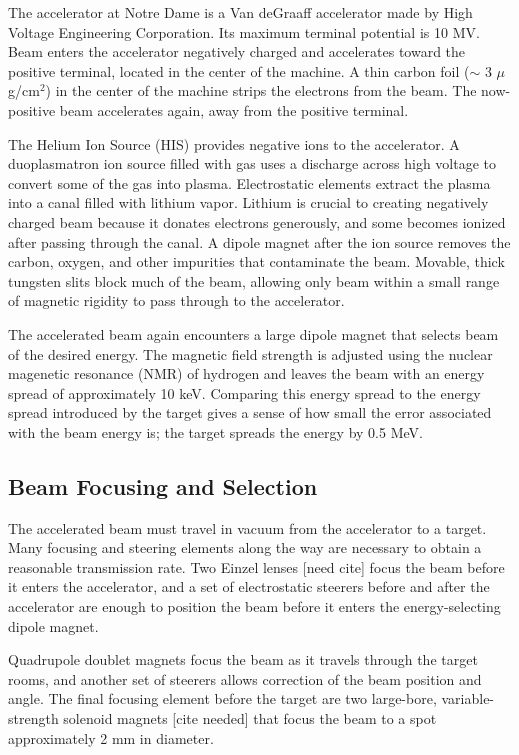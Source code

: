 The accelerator at Notre Dame is a Van deGraaff accelerator made by High Voltage Engineering Corporation.  Its maximum terminal potential is 10 MV.  Beam enters the accelerator negatively charged and accelerates toward the positive terminal, located in the center of the machine. A thin carbon foil ($\sim$ 3 $\mu$g/cm$^2$) in the center of the machine strips the electrons from the beam.  The now-positive beam accelerates again, away from the positive terminal.  

The Helium Ion Source (HIS) provides negative  ions to the accelerator.  A duoplasmatron ion source filled with  gas uses a discharge across high voltage to convert some of the gas into plasma.  Electrostatic elements extract the plasma into a canal filled with lithium vapor.  Lithium is crucial to creating negatively charged beam because it donates electrons generously, and some  becomes ionized after passing through the canal.  A dipole magnet after the ion source removes the carbon, oxygen, and other impurities that contaminate the  beam.  Movable, thick tungsten slits block much of the beam, allowing only beam within a small range of magnetic rigidity to pass through to the accelerator.

The accelerated beam again encounters a large dipole magnet that selects beam of the desired energy.  The magnetic field strength is adjusted using the nuclear magenetic resonance (NMR) of hydrogen and leaves the beam with an energy spread of approximately 10 keV.  Comparing this energy spread to the energy spread introduced by the target gives a sense of how small the error associated with the beam energy is; the target spreads the energy by 0.5 MeV.

\subsection{Beam Focusing and Selection}

The accelerated beam must travel in vacuum from the accelerator to a target.  Many focusing and steering elements along the way are necessary to obtain a reasonable transmission rate.  Two Einzel lenses [need cite] focus the beam before it enters the accelerator, and a set of electrostatic steerers before and after the accelerator are enough to position the beam before it enters the energy-selecting dipole magnet.

Quadrupole doublet magnets focus the beam as it travels through the target rooms, and another set of steerers allows correction of the beam position and angle.  The final focusing element before the target are two large-bore, variable-strength solenoid magnets [cite needed] that focus the beam to a spot approximately 2 mm in diameter.

